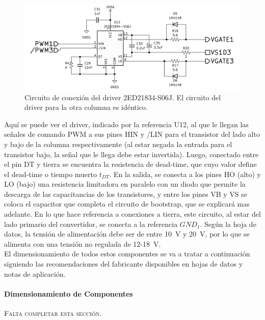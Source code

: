 \begin{figure}[h]
    \centering
    \includegraphics[scale=0.95]{Imagenes/Circuito Driver.png}
    \caption{Circuito de conexión del driver 2ED21834-S06J. El circuito del driver para la otra columna es idéntico.}
    \label{circuito_driver}
\end{figure}

Aquí se puede ver el driver, indicado por la referencia U12, al que le llegan las señales de comando PWM a sus pines HIN y /LIN para el transistor del lado alto y bajo de la columna respectivamente (al estar negada  la entrada para el transistor bajo, la señal que le llega debe estar invertida). Luego, conectado entre el pin DT y tierra se encuentra la resistencia de dead-time, que cuyo valor define el dead-time o tiempo muerto $t_{DT}$. En la salida, se conecta a los pines HO (alto) y LO (bajo) una resistencia limitadora en paralelo con un diodo que permite la descarga de las capacitancias de los transistores, y entre los pines VB y VS se coloca el capacitor que completa el circuito de bootstrap, que se explicará mas adelante. En lo que hace referencia a conexiones a tierra, este circuito, al estar del lado primario del convertidor, se conecta a la referencia $GND_1$. Según la hoja de datos, la tensión de alimentación debe ser de entre \SI[]{10}[]{\volt} y \SI[]{20}[]{\volt}, por lo que se alimenta con una tensión no regulada de \num{12}-\SI[]{18}[]{\volt}.\\

El dimensionamiento de todos estos componentes se va a tratar a continuación siguiendo las recomendaciones del fabricante disponibles en hojas de datos y notas de aplicación.\\

\paragraph{Dimensionamiento de Componentes}

{\Bold\scshape\Large Falta completar esta sección.}\\

